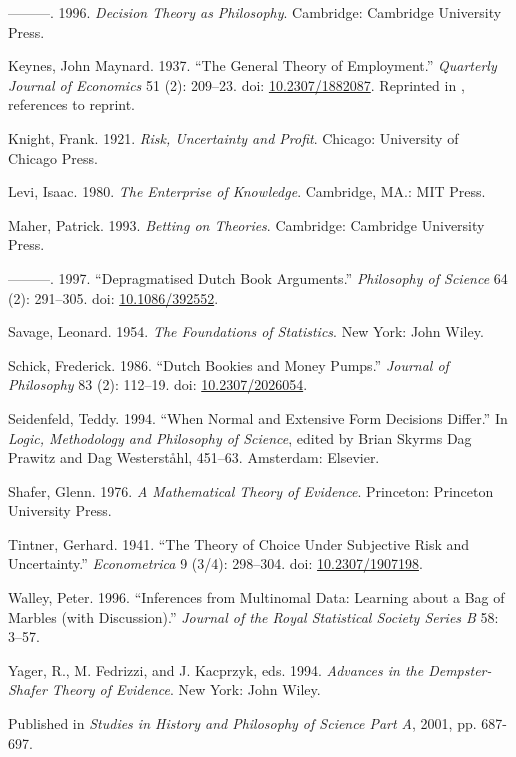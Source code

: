 \documentclass[
  11pt,
  letterpaper,
  DIV=11,
  numbers=noendperiod,
  twoside]{scrartcl}
\newlength{\cslhangindent}
\newenvironment{CSLReferences}[2] %
 {\begin{list}{}{%
  \setlength{\itemindent}{0pt}
  \setlength{\leftmargin}{0pt}
  \setlength{\parsep}{0pt}
  \ifodd #1
   \setlength{\leftmargin}{\cslhangindent}
   \setlength{\itemindent}{-1\cslhangindent}
  \fi
  \setlength{\itemsep}{#2\baselineskip}}}
 {\end{list}}
\begin{document}
\begin{CSLReferences}{1}{0}
---------. 1996. \emph{Decision Theory as Philosophy}. Cambridge:
Cambridge University Press.

Keynes, John Maynard. 1937. {``The General Theory of Employment.''}
\emph{Quarterly Journal of Economics} 51 (2): 209--23. doi:
\href{https://doi.org/10.2307/1882087}{10.2307/1882087}. Reprinted in
\cite[XIV 109-123]{KeynesCW}, references to reprint.

Knight, Frank. 1921. \emph{Risk, Uncertainty and Profit}. Chicago:
University of Chicago Press.

Levi, Isaac. 1980. \emph{The Enterprise of Knowledge}. Cambridge, MA.:
MIT Press.

Maher, Patrick. 1993. \emph{Betting on Theories}. Cambridge: Cambridge
University Press.

---------. 1997. {``Depragmatised Dutch Book Arguments.''}
\emph{Philosophy of Science} 64 (2): 291--305. doi:
\href{https://doi.org/10.1086/392552}{10.1086/392552}.

Savage, Leonard. 1954. \emph{The Foundations of Statistics}. New York:
John Wiley.

Schick, Frederick. 1986. {``Dutch Bookies and Money Pumps.''}
\emph{Journal of Philosophy} 83 (2): 112--19. doi:
\href{https://doi.org/10.2307/2026054}{10.2307/2026054}.

Seidenfeld, Teddy. 1994. {``When Normal and Extensive Form Decisions
Differ.''} In \emph{Logic, Methodology and Philosophy of Science},
edited by Brian Skyrms Dag Prawitz and Dag Westerståhl, 451--63.
Amsterdam: Elsevier.

Shafer, Glenn. 1976. \emph{A Mathematical Theory of Evidence}.
Princeton: Princeton University Press.

Tintner, Gerhard. 1941. {``The Theory of Choice Under Subjective Risk
and Uncertainty.''} \emph{Econometrica} 9 (3/4): 298--304. doi:
\href{https://doi.org/10.2307/1907198}{10.2307/1907198}.

Walley, Peter. 1996. {``Inferences from Multinomal Data: Learning about
a Bag of Marbles (with Discussion).''} \emph{Journal of the Royal
Statistical Society Series B} 58: 3--57.

Yager, R., M. Fedrizzi, and J. Kacprzyk, eds. 1994. \emph{Advances in
the Dempster- Shafer Theory of Evidence}. New York: John Wiley.

\end{CSLReferences}



\noindent Published in\emph{
Studies in History and Philosophy of Science Part A}, 2001, pp. 687-697.
\end{document}
